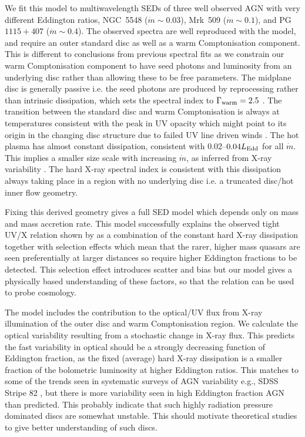 \documentclass[a4paper,fleqn,usenatbib]{mnras}
\begin{document}
We fit this model to multiwavelength SEDs of three well observed AGN
with very different Eddington ratios, NGC~5548 ($\dot{m}\sim 0.03$),
Mrk~509 ($\dot{m}\sim 0.1$), and PG~$1115+407$ ($\dot{m}\sim 0.4$).
The observed spectra are well reproduced with the model, and require
an outer standard disc as well as a warm Comptonisation
component. This is different to conclusions from previous spectral
fits as we constrain our warm Comptonisation component to have seed
photons and luminosity from an underlying disc rather than
allowing these to be free parameters. The midplane disc is generally
passive i.e. the seed photons are produced by reprocessing rather than
intrinsic dissipation, which sets the spectral index to
$\Gamma_{\rm warm}=2.5$ \citep{petrucci2017}. The transition between the
standard disc and warm Comptonisation is always at temperatures
consistent with the peak in UV opacity which might point to its origin
in the changing disc structure due to failed UV line driven winds
\citep{laor2014}. The hot plasma has almost constant dissipation,
consistent with 0.02--$0.04L_{\rm Edd}$ for all $\dot{m}$. This implies a
smaller size scale with increasing $\dot{m}$, as inferred from X-ray
variability \citep{mchardy2006}. The hard X-ray spectral index is
consistent with this dissipation always taking place in a region with
no underlying disc i.e. a truncated disc/hot inner flow geometry.

Fixing this derived geometry gives a full SED model which depends only
on mass and mass accretion rate. This model successfully explains the
observed tight UV/X relation shown by \cite{lusso2017} as a
combination of the constant hard X-ray dissipation together with
selection effects which mean that the rarer, higher mass quasars are
seen preferentially at larger distances so require higher Eddington
fractions to be detected. This selection effect introduces scatter and
bias but our model gives a physically based understanding of these
factors, so that the relation can be used to probe cosmology.  

The model includes the contribution to the optical/UV flux from 
X-ray illumination of the outer disc and warm Comptonisation
region. We calculate the optical variability resulting from a
stochastic change in X-ray flux. This predicts the fast variability in
optical should be a strongly decreasing function of Eddington
fraction, as the fixed (average) hard X-ray dissipation is a smaller
fraction of the bolometric luminosity at higher Eddington ratios. This
matches to some of the trends seen in systematic surveys of AGN
variability e.g., SDSS Stripe 82 \citep{macleod2010}, but there is more
variability seen in high Eddington fraction AGN than predicted. This
probably indicate that such highly radiation pressure dominated discs
are somewhat unstable. This should motivate theoretical studies to
give better understanding of such discs. 
\end{document}
